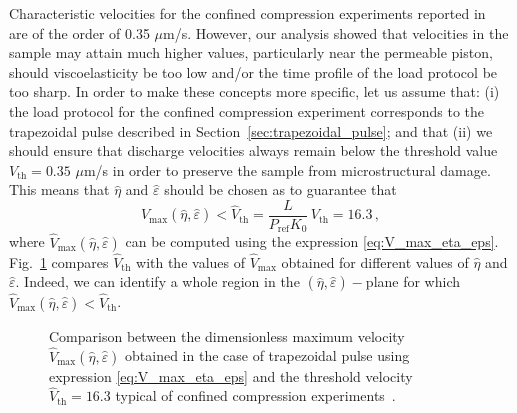 \documentclass[12pt,a4paper]{amsart}
\theoremstyle{definition}
\begin{document}
Characteristic velocities for the confined compression experiments reported in~\cite{Soltz1998} are of the order of 0.35 $\mu$m/s.
However, our analysis showed that velocities in the sample may attain much higher values, particularly near the permeable piston, should viscoelasticity be too low and/or the time profile of the load protocol be too sharp. In order to make these concepts more specific, let us assume that: (i) the load protocol for the confined compression experiment corresponds to the trapezoidal pulse described in Section~\ref{sec:trapezoidal_pulse}; and that (ii) we should ensure that discharge velocities always remain below the threshold value $V_{\text{th}}=0.35$ $\mu$m/s in order to preserve the sample from microstructural damage. This means that $\hat{\eta}$ and $\hat{\varepsilon}$ should be chosen as to guarantee that
\begin{equation}
\hat{V}_{\max } (\hat{\eta},\hat{\varepsilon}) <  \hat{V}_{\text{th}} =  \frac{L}{P_{\text{ref}} K_0}\, V_{\text{th}} = 16.3\,,
\end{equation}
where $\hat{V}_{\max } (\hat{\eta},\hat{\varepsilon})$ can be computed using the expression \eqref{eq:V_max_eta_eps}. Fig.~\ref{fig:max_discharge_velocity_trapez_pulse_AS} compares $ \hat{V}_{\text{th}}$ with the values of $\hat{V}_{\max } $ obtained for different values of $\hat{\eta}$ and $\hat{\varepsilon}$.  Indeed, we can identify a whole region in the $(\hat{\eta},\hat{\varepsilon}) -$plane for which $\hat{V}_{\max } (\hat{\eta},\hat{\varepsilon}) <  \hat{V}_{\text{th}}$.



\begin{figure}[h!]
\begin{center}
\end{center}
\caption{Comparison between the dimensionless maximum velocity $\hat{V}_{\max}(\hat{\eta},\hat{\varepsilon})$ obtained in the case of trapezoidal pulse using expression \eqref{eq:V_max_eta_eps} and the threshold velocity $\hat{V}_{\text{th}} = 16.3$ typical of confined compression experiments~\cite{Soltz1998}.}
\label{fig:max_discharge_velocity_trapez_pulse_AS}
\end{figure}
\end{document}
